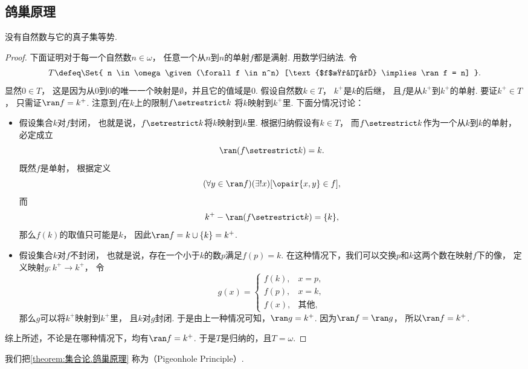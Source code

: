 \subsection{鸽巢原理}
\begin{theorem}\label{theorem:集合论.鸽巢原理}
没有自然数与它的真子集等势.
\begin{proof}
下面证明对于每一个自然数\(n \in \omega\)，
任意一个从\(n\)到\(n\)的单射\(f\)都是满射.
用数学归纳法.
令\[
	T \defeq \Set{
		n \in \omega
		\given
		(\forall f \in n^n)
		[\text{$f$是单射} \implies \ran f = n]
	}.
\]
显然\(0 \in T\)，
这是因为从\(0\)到\(0\)的唯一一个映射是\(\emptyset\)，并且它的值域是\(0\).
假设自然数\(k \in T\)，
\(k^+\)是\(k\)的后继，
且\(f\)是从\(k^+\)到\(k^+\)的单射.
要证\(k^+ \in T\)，
只需证\(\ran f = k^+\).
注意到\(f\)在\(k\)上的限制\(f \setrestrict k\)
将\(k\)映射到\(k^+\)里.
下面分情况讨论：\begin{itemize}
	\item 假设集合\(k\)对\(f\)封闭，
	也就是说，\(f \setrestrict k\)将\(k\)映射到\(k\)里.
	根据归纳假设有\(k \in T\)，
	而\(f \setrestrict k\)作为一个从\(k\)到\(k\)的单射，
	必定成立\[
		\ran(f \setrestrict k) = k.
	\]
	既然\(f\)是单射，
	根据定义\[
		(\forall y \in \ran f)
		(\exists! x)
		[\opair{x,y} \in f],
	\]
	而\[
		k^+ - \ran(f \setrestrict k) = \{k\},
	\]
	那么\(f(k)\)的取值只可能是\(k\)，
	因此\(\ran f = k \cup \{k\} = k^+\).

	\item 假设集合\(k\)对\(f\)不封闭，
	也就是说，存在一个小于\(k\)的数\(p\)满足\(f(p) = k\).
	在这种情况下，我们可以交换\(p\)和\(k\)这两个数在映射\(f\)下的像，
	定义映射\(g\colon k^+ \to k^+\)，
	令\[
		g(x) = \left\{ \begin{array}{cl}
			f(k), & x = p, \\
			f(p), & x = k, \\
			f(x), & \text{其他},
		\end{array} \right.
	\]
	那么\(g\)可以将\(k^+\)映射到\(k^+\)里，
	且\(k\)对\(g\)封闭.
	于是由上一种情况可知，\(\ran g = k^+\).
	因为\(\ran f = \ran g\)，
	所以\(\ran f = k^+\).
\end{itemize}
综上所述，不论是在哪种情况下，均有\(\ran f = k^+\).
于是\(T\)是归纳的，且\(T = \omega\).
\end{proof}
\end{theorem}

我们把\cref{theorem:集合论.鸽巢原理}
称为（Pigeonhole Principle）.

